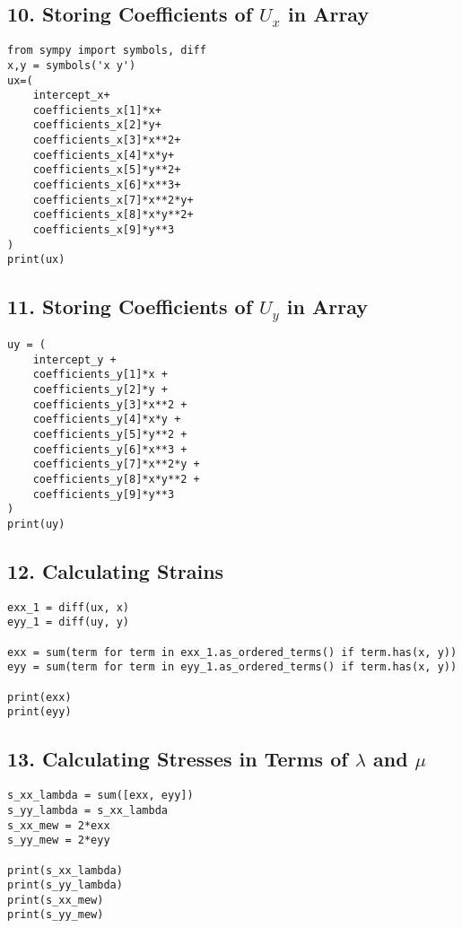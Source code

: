 \documentclass{article}
\begin{document}
\subsection*{10. Storing Coefficients of \( U_x \) in Array}
\begin{lstlisting}[style=python]
from sympy import symbols, diff
x,y = symbols('x y')
ux=(
    intercept_x+
    coefficients_x[1]*x+
    coefficients_x[2]*y+
    coefficients_x[3]*x**2+
    coefficients_x[4]*x*y+
    coefficients_x[5]*y**2+
    coefficients_x[6]*x**3+
    coefficients_x[7]*x**2*y+
    coefficients_x[8]*x*y**2+
    coefficients_x[9]*y**3
)
print(ux)
\end{lstlisting}

\subsection*{11. Storing Coefficients of \( U_y \) in Array}
\begin{lstlisting}[style=python]
uy = (
    intercept_y +
    coefficients_y[1]*x +
    coefficients_y[2]*y +
    coefficients_y[3]*x**2 +
    coefficients_y[4]*x*y +
    coefficients_y[5]*y**2 +
    coefficients_y[6]*x**3 +
    coefficients_y[7]*x**2*y +
    coefficients_y[8]*x*y**2 +
    coefficients_y[9]*y**3
)
print(uy)
\end{lstlisting}

\subsection*{12. Calculating Strains}
\begin{lstlisting}[style=python]
exx_1 = diff(ux, x)
eyy_1 = diff(uy, y)

exx = sum(term for term in exx_1.as_ordered_terms() if term.has(x, y))
eyy = sum(term for term in eyy_1.as_ordered_terms() if term.has(x, y))

print(exx)
print(eyy)
\end{lstlisting}

\subsection*{13. Calculating Stresses in Terms of \( \lambda \) and \( \mu \)}
\begin{lstlisting}[style=python]
s_xx_lambda = sum([exx, eyy])
s_yy_lambda = s_xx_lambda
s_xx_mew = 2*exx
s_yy_mew = 2*eyy

print(s_xx_lambda)
print(s_yy_lambda)
print(s_xx_mew)
print(s_yy_mew)
\end{lstlisting}
\end{document}
